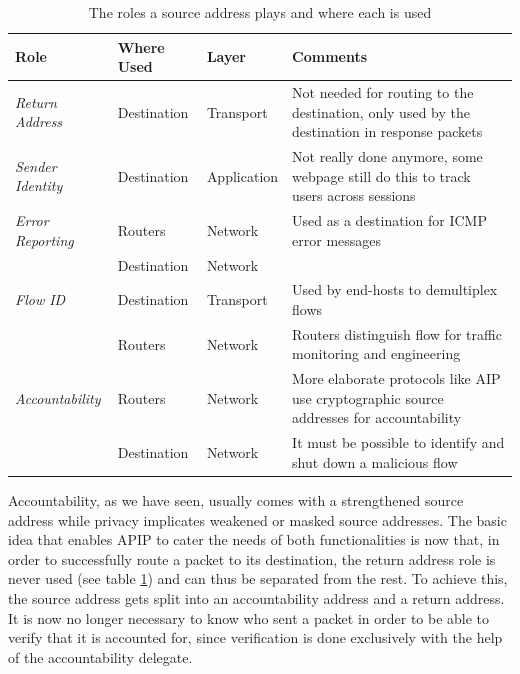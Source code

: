 \documentclass{acm_proc_article-sp}
\begin{document}
\begin{table}[t]
	\label{tab:sourcerole}
	\renewcommand{\arraystretch}{1.5}
	\begin{tabularx}{\textwidth}{lllX}
		\hline 
 		\textbf{Role} & \textbf{Where Used} & \textbf{Layer} & \textbf{Comments} \\ \hline
		\emph{Return Address} & Destination & Transport & Not needed for routing to the destination, only used by the destination in response packets \\
		\emph{Sender Identity} & Destination & Application & Not really done anymore, some webpage still do this to track users across sessions \\
		\emph{Error Reporting} & Routers & Network & Used as a destination for ICMP error messages \\
			& Destination & Network & \\
		\emph{Flow ID} & Destination & Transport & Used by end-hosts to demultiplex flows \\
			& Routers & Network & Routers distinguish flow for traffic monitoring and engineering \\
		\emph{Accountability} & Routers & Network & More elaborate protocols like AIP use cryptographic source addresses for accountability \\
			& Destination & Network & It must be possible to identify and shut down a malicious flow \\
		\hline
	\end{tabularx}
	\caption{The roles a source address plays and where each is used \cite{apip}}
\end{table}

Accountability, as we have seen, usually comes with a strengthened source address while privacy implicates weakened or masked source addresses. The basic idea that enables APIP to cater the needs of both functionalities is now that, in order to successfully route a packet to its destination, the return address role is never used (see table \ref{tab:sourcerole}) and can thus be separated from the rest. To achieve this, the source address gets split into an accountability address and a return address. It is now no longer necessary to know who sent a packet in order to be able to verify that it is accounted for, since verification is done exclusively with the help of the accountability delegate.
\end{document}
